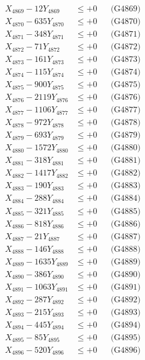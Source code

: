 \documentclass[a4paper,10pt]{article}
\begin{document}
{\begin{align}
X_{4869} - 12Y_{4869} &\leq +0 && \text{(G4869)} \\
X_{4870} - 635Y_{4870} &\leq +0 && \text{(G4870)} \\
\allowbreak
X_{4871} - 348Y_{4871} &\leq +0 && \text{(G4871)} \\
X_{4872} - 71Y_{4872} &\leq +0 && \text{(G4872)} \\
X_{4873} - 161Y_{4873} &\leq +0 && \text{(G4873)} \\
X_{4874} - 115Y_{4874} &\leq +0 && \text{(G4874)} \\
X_{4875} - 900Y_{4875} &\leq +0 && \text{(G4875)} \\
X_{4876} - 2119Y_{4876} &\leq +0 && \text{(G4876)} \\
X_{4877} - 1106Y_{4877} &\leq +0 && \text{(G4877)} \\
X_{4878} - 972Y_{4878} &\leq +0 && \text{(G4878)} \\
X_{4879} - 693Y_{4879} &\leq +0 && \text{(G4879)} \\
X_{4880} - 1572Y_{4880} &\leq +0 && \text{(G4880)} \\
\allowbreak
X_{4881} - 318Y_{4881} &\leq +0 && \text{(G4881)} \\
X_{4882} - 1417Y_{4882} &\leq +0 && \text{(G4882)} \\
X_{4883} - 190Y_{4883} &\leq +0 && \text{(G4883)} \\
X_{4884} - 288Y_{4884} &\leq +0 && \text{(G4884)} \\
X_{4885} - 321Y_{4885} &\leq +0 && \text{(G4885)} \\
X_{4886} - 818Y_{4886} &\leq +0 && \text{(G4886)} \\
X_{4887} - 21Y_{4887} &\leq +0 && \text{(G4887)} \\
X_{4888} - 146Y_{4888} &\leq +0 && \text{(G4888)} \\
X_{4889} - 1635Y_{4889} &\leq +0 && \text{(G4889)} \\
X_{4890} - 386Y_{4890} &\leq +0 && \text{(G4890)} \\
\allowbreak
X_{4891} - 1063Y_{4891} &\leq +0 && \text{(G4891)} \\
X_{4892} - 287Y_{4892} &\leq +0 && \text{(G4892)} \\
X_{4893} - 215Y_{4893} &\leq +0 && \text{(G4893)} \\
X_{4894} - 445Y_{4894} &\leq +0 && \text{(G4894)} \\
X_{4895} - 85Y_{4895} &\leq +0 && \text{(G4895)} \\
X_{4896} - 520Y_{4896} &\leq +0 && \text{(G4896)} \\

\end{align}}
\end{document}

